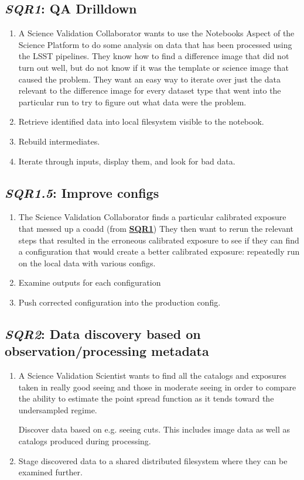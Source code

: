 \documentclass[DM,toc,lsstdraft]{lsstdoc}
\newcommand{\usecase}[3]{%
\subsection{\emph{#1}: #2}
\label{use:#1}
\begin{enumerate}[label=\alph*.]
#3
\end{enumerate}
}
\newcommand{\useref}[1]{\hyperref[use:#1]{\textcolor{lsstblue}{\textbf{#1}}}}
\begin{document}
\usecase{SQR1}{QA Drilldown}{%

\item
A Science Validation Collaborator wants to use the Notebooks Aspect of the Science Platform to do some analysis on data that has been processed using the LSST pipelines.
They know how to find a difference image that did not turn out well, but do not know if it was the template or science image that caused the problem.
They want an easy way to iterate over just the data relevant to the difference image for every dataset type that went into the particular run to try to figure out what data were the problem.

\item
Retrieve identified data into local filesystem visible to the notebook.

\item
Rebuild intermediates.

\item
Iterate through inputs, display them, and look for bad data.

}

\usecase{SQR1.5}{Improve configs}{%

\item

The Science Validation Collaborator finds a particular calibrated exposure that messed up a coadd (from \useref{SQR1})
They then want to rerun the relevant steps that resulted in the erroneous calibrated exposure to see if they can find a configuration that would create a better calibrated exposure: repeatedly run on the local data with various configs.

\item
Examine outputs for each configuration

\item
Push corrected configuration into the production config.

}

\usecase{SQR2}{Data discovery based on observation/processing metadata}{%

\item
A Science Validation Scientist wants to find all the catalogs and exposures taken in really good seeing and those in moderate seeing in order to compare the ability to estimate the point spread function as it tends toward the undersampled regime.

Discover data based on e.g. seeing cuts.
This includes image data as well as catalogs produced during processing.

\item
Stage discovered data to a shared distributed filesystem where they can be examined further.

}
\end{document}
